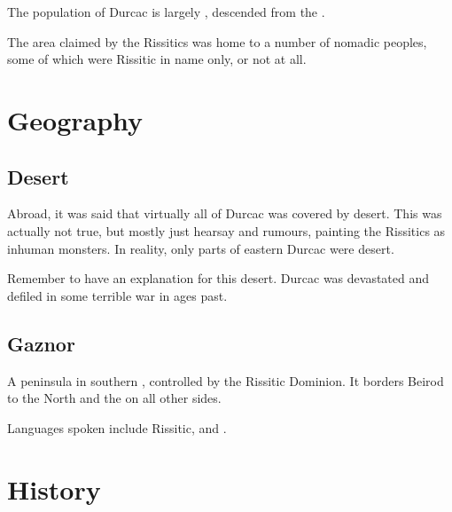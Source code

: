 The \scathaese{} population of Durcac is largely , descended from the . 

The area claimed by the Rissitics was home to a number of nomadic peoples, some of which were Rissitic in name only, or not at all. 















\section{Geography}





\subsection{Desert}
Abroad, it was said that virtually all of Durcac was covered by desert. 
This was actually not true, but mostly just hearsay and rumours, painting the Rissitics as inhuman monsters. 
In reality, only parts of eastern Durcac were desert. 

Remember to have an explanation for this desert. 
Durcac was devastated and defiled in some terrible war in ages past. 





\subsection{Gaznor}
A peninsula in southern \Velcad{}, controlled by the Rissitic Dominion. It borders Beirod to the North and the \Risvaelsea{} on all other sides. 

Languages spoken include Rissitic, \Velcadian{} and \Ortic. 















\section{History}





